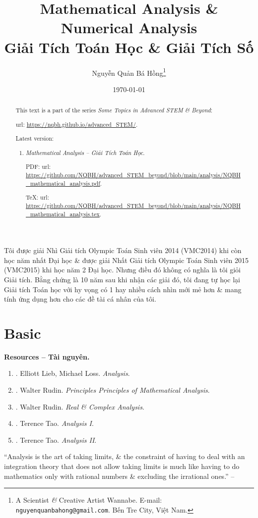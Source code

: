 \documentclass{article}
\title{Mathematical Analysis \& Numerical Analysis\\Giải Tích Toán Học \& Giải Tích Số}
\author{Nguyễn Quản Bá Hồng\footnote{A Scientist {\it\&} Creative Artist Wannabe. E-mail: {\tt nguyenquanbahong@gmail.com}. Bến Tre City, Việt Nam.}}
\date{\today}
\begin{document}
\maketitle
\begin{abstract}
	This text is a part of the series {\it Some Topics in Advanced STEM \& Beyond}:
	
	{\sc url}: \url{https://nqbh.github.io/advanced_STEM/}.
	
	Latest version:
	\begin{enumerate}
		\item {\it Mathematical Analysis -- Giải Tích Toán Học}.
		
		PDF: {\sc url}: \url{https://github.com/NQBH/advanced_STEM_beyond/blob/main/analysis/NQBH_mathematical_analysis.pdf}.
		
		\TeX: {\sc url}: \url{https://github.com/NQBH/advanced_STEM_beyond/blob/main/analysis/NQBH_mathematical_analysis.tex}.
	\end{enumerate}
\end{abstract}
\tableofcontents


Tôi được giải Nhì Giải tích Olympic Toán Sinh viên 2014 (VMC2014) khi còn học năm nhất Đại học \& được giải Nhất Giải tích Olympic Toán Sinh viên 2015 (VMC2015) khi học năm 2 Đại học. Nhưng điều đó không có nghĩa là tôi giỏi Giải tích. Bằng chứng là 10 năm sau khi nhận các giải đó, tôi đang tự học lại Giải tích Toán học với hy vọng có 1 hay nhiều cách nhìn mới mẻ hơn \& mang tính ứng dụng hơn cho các đề tài cá nhân của tôi.

\section{Basic}
\textbf{\textsf{Resources -- Tài nguyên.}}
\begin{enumerate}
	\item \cite{Lieb_Loss2001}. {\sc Elliott Lieb, Michael Loss}. {\it Analysis}.
	\item \cite{Rudin1976}. {\sc Walter Rudin}. {\it Principles Principles of Mathematical Analysis}.
	\item \cite{Rudin1973,Rudin1987}. {\sc Walter Rudin}. {\it Real \& Complex Analysis}.
	\item \cite{Tao_analysis_1}. {\sc Terence Tao}. {\it Analysis I}.
	\item \cite{Tao_analysis_2}. {\sc Terence Tao}. {\it Analysis II}.
\end{enumerate}
``Analysis is the art of taking limits, \& the constraint of having to deal with an integration theory that does not allow taking limits is much like having to do mathematics only with rational numbers \& excluding the irrational ones.'' -- \cite[Chap. 1, p. 1]{Lieb_Loss2001}
\end{document}
